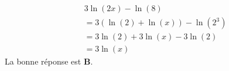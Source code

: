 \begin{align*}
&3\ln(2x) - \ln(8) \\
&= 3(\ln(2) + \ln(x)) - \ln(2^3) \\
&= 3\ln(2) + 3\ln(x) - 3\ln(2) \\
&= 3\ln(x)
\end{align*}
La bonne réponse est \textbf{B}.

\bigskip
